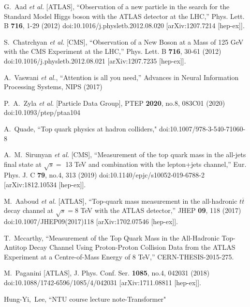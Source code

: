 \begin{thebibliography}{99}

G.~Aad \textit{et al.} [ATLAS],
``Observation of a new particle in the search for the Standard Model Higgs boson with the ATLAS detector at the LHC,''
Phys. Lett. B \textbf{716}, 1-29 (2012)
doi:10.1016/j.physletb.2012.08.020
[arXiv:1207.7214 [hep-ex]].

S.~Chatrchyan \textit{et al.} [CMS],
``Observation of a New Boson at a Mass of 125 GeV with the CMS Experiment at the LHC,''
Phys. Lett. B \textbf{716}, 30-61 (2012)
doi:10.1016/j.physletb.2012.08.021
[arXiv:1207.7235 [hep-ex]].

A.~Vaswani \textit{et al.},
``Attention is all you need,''
Advances in Neural Information Processing Systems, NIPS (2017)

P.~A.~Zyla \textit{et al.} [Particle Data Group],
PTEP \textbf{2020}, no.8, 083C01 (2020)
doi:10.1093/ptep/ptaa104

A.~Quade,
``Top quark physics at hadron colliders,"
doi:10.1007/978-3-540-71060-8

A.~M.~Sirunyan \textit{et al.} [CMS],
``Measurement of the top quark mass in the all-jets final state at $\sqrt{s} =$ 13 TeV and combination with the lepton+jets channel,''
Eur. Phys. J. C \textbf{79}, no.4, 313 (2019)
doi:10.1140/epjc/s10052-019-6788-2
[arXiv:1812.10534 [hep-ex]].

M.~Aaboud \textit{et al.} [ATLAS],
``Top-quark mass measurement in the all-hadronic $ t\overline{t} $ decay channel at $ \sqrt{s}=8 $ TeV with the ATLAS detector,''
JHEP \textbf{09}, 118 (2017)
doi:10.1007/JHEP09(2017)118
[arXiv:1702.07546 [hep-ex]].

T.~Mccarthy,
``Measurement of the Top Quark Mass in the All-Hadronic Top-Antitop Decay Channel Using Proton-Proton Collision Data from the ATLAS Experiment at a Centre-of-Mass Energy of 8 TeV,''
CERN-THESIS-2015-275.

M.~Paganini [ATLAS],
J. Phys. Conf. Ser. \textbf{1085}, no.4, 042031 (2018)
doi:10.1088/1742-6596/1085/4/042031
[arXiv:1711.08811 [hep-ex]].



Hung-Yi,~Lee,
``NTU course lecture note-Transformer"


\end{thebibliography}
\newpage
